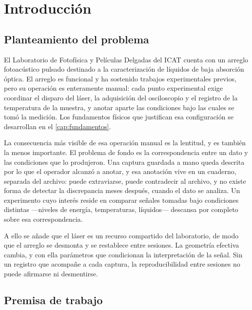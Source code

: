 \chapter{Introducción}
\label{cap:introduccion}

\section{Planteamiento del problema}
\label{sec:planteamiento}

El Laboratorio de Fotofísica y Películas Delgadas del ICAT cuenta con
un arreglo fotoacústico pulsado destinado a la caracterización de
líquidos de baja absorción óptica. El arreglo es funcional y ha
sostenido trabajos experimentales previos, pero su operación es
enteramente manual: cada punto experimental exige coordinar el disparo
del láser, la adquisición del osciloscopio y el registro de la
temperatura de la muestra, y anotar aparte las condiciones bajo las
cuales se tomó la medición. Los fundamentos físicos que justifican esa
configuración se desarrollan en el \cref{cap:fundamentos}.

La consecuencia más visible de esa operación manual es la lentitud, y
es también la menos importante. El problema de fondo es la
correspondencia entre un dato y las condiciones que lo produjeron. Una
captura guardada a mano queda descrita por lo que el operador alcanzó a
anotar, y esa anotación vive en un cuaderno, separada del archivo: puede
extraviarse, puede contradecir al archivo, y no existe forma de detectar
la discrepancia meses después, cuando el dato se analiza. Un experimento
cuyo interés reside en comparar señales tomadas bajo condiciones
distintas —niveles de energía, temperaturas, líquidos— descansa por
completo sobre esa correspondencia.

A ello se añade que el láser es un recurso compartido del laboratorio,
de modo que el arreglo se desmonta y se restablece entre sesiones. La
geometría efectiva cambia, y con ella parámetros que condicionan la
interpretación de la señal. Sin un registro que acompañe a cada captura,
la reproducibilidad entre sesiones no puede afirmarse ni desmentirse.

\section{Premisa de trabajo}
\label{sec:premisa}

